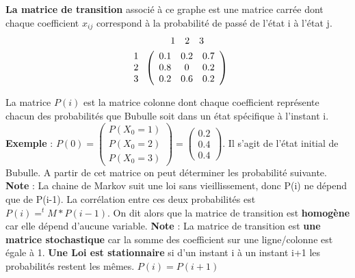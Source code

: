 \documentclass[a4paper]{article}
\begin{document}
\textbf{La matrice de transition} associé à ce graphe est une matrice carrée dont chaque coefficient $x_{ij}$ correspond à la probabilité de passé de l'état i à l'état j.
\newline
\begin{eqnarray}
\begin{array}{l c r c c}
1 & 2 & 3 & &
\end{array} \\
\left.
\begin{array}{l}
1 \\
2 \\
3
\end{array}
 \right.
 \left(
\begin{array}{c c c}
0.1 & 0.2 & 0.7 \\
0.8 & 0 & 0.2 \\
0.2 & 0.6 & 0.2
\end{array}
 \right)
\end{eqnarray}

La matrice $P(i)$ est la matrice colonne dont chaque coefficient représente chacun des probabilités que Bubulle soit dans un état spécifique à l'instant i. 
\newline
\textbf{Exemple} : $P(0)=\left( \begin{array}{c} P(X_0=1) \\ P(X_0=2) \\ P(X_0=3) \end{array} \right)= \left( \begin{array}{c} 0.2 \\ 0.4 \\ 0.4 \end{array} \right)$. Il s'agit de l'état initial de Bubulle. A partir de cet matrice on peut déterminer les probabilité suivante. \newline
\textbf{Note} : La chaine de Markov suit une loi sans vieillissement, donc P(i) ne dépend que de P(i-1). La corrélation entre ces deux probabilités est $P(i) = ^tM * P(i-1)$. On dit alors que la matrice de transition est \textbf{homogène} car elle dépend d'aucune variable. \newline
\textbf{Note} : La matrice de transition est \textbf{une matrice stochastique} car la somme des coefficient sur une ligne/colonne est égale à 1.
\textbf{Une Loi est stationnaire} si d'un instant i à un instant i+1 les probabilités restent les mêmes. $P(i) = P(i+1)$
\end{document}
